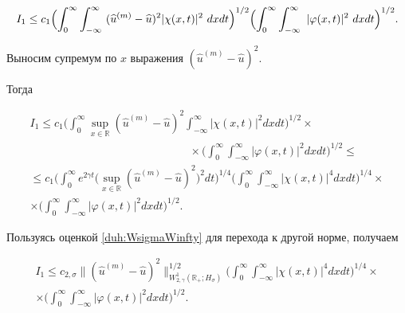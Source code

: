 $$

I_1\le c_1 \Bigl(\int_0^\infty \int_{-\infty}^\infty~(\widehat{u}^{(m)}- \widehat{u})^2|\chi(x,t)|^2~dxdt

\Bigr)^{1/2}\Bigl(\int_0^\infty \int_{-\infty}^\infty~|\varphi(x,t)|^2~dxdt

\Bigr)^{1/2}.

$$

Выносим супремум по $x$ выражения $(\widehat{u}^{(m)}- \widehat{u})^2$. 

Тогда

\begin{multline*}

I_1\le c_1 

\biggl(

\int_0^\infty \sup_{x\in \mathbb R}(\widehat{u}^{(m)}- \widehat{u})^2 

\int_{-\infty}^\infty |\chi(x,t)|^2 dxdt\biggr)^{1/2}

\times

\\

\hspace{6cm}

\times

\biggl(

\int_0^\infty \int_{-\infty}^\infty |\varphi(x,t)|^2 dxdt

\biggr)^{1/2}\le

\\

\le c_1 

\biggl(

\int_0^\infty e^{2\gamma t}\bigl(\sup_{x\in \mathbb R}(\widehat{u}^{(m)}- \widehat{u})^2\bigr)^2dt\biggr)^{1/4} 

\biggl(

\int_0^\infty\int_{-\infty}^\infty |\chi(x,t)|^4 dxdt\biggr)^{1/4}\times

\\

\times 

\biggl(

\int_0^\infty \int_{-\infty}^\infty |\varphi(x,t)|^2 dxdt\biggr)^{1/2}.

\end{multline*}



Пользуясь оценкой \eqref{duh:WsigmaWinfty} для перехода к другой норме, получаем

\begin{multline*}

I_1\le c_{2,\sigma} 

\|(\widehat{u}^{(m)}- \widehat{u})^2\|_{W^1_{2,\gamma}(\mathbb R_{+}; H_{\sigma})}^{1/2} \biggl(\int_0^\infty\int_{-\infty}^\infty |\chi(x,t)|^4 dxdt

\biggr)^{1/4}\times

\\

\times 

\biggl(\int_0^\infty \int_{-\infty}^\infty |\varphi(x,t)|^2 dxdt

\biggr)^{1/2}.

\end{multline*}

